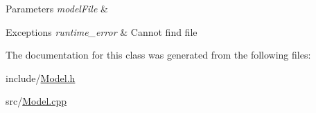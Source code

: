 \begin{DoxyParams}{Parameters}
{\em model\+File} & \\
\hline
\end{DoxyParams}

\begin{DoxyExceptions}{Exceptions}
{\em runtime\+\_\+error} & Cannot find file \\
\hline
\end{DoxyExceptions}


The documentation for this class was generated from the following files\+:\begin{DoxyCompactItemize}
\item 
include/\hyperlink{Model_8h}{Model.\+h}\item 
src/\hyperlink{Model_8cpp}{Model.\+cpp}\end{DoxyCompactItemize}
